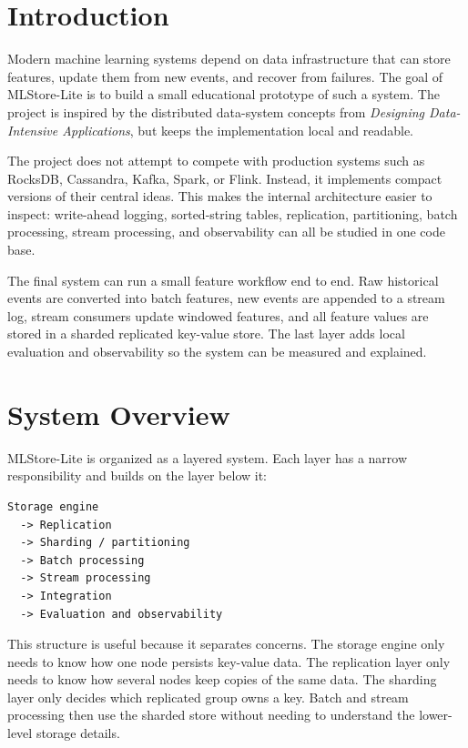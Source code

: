 \section{Introduction}

Modern machine learning systems depend on data infrastructure that can store
features, update them from new events, and recover from failures. The goal of
MLStore-Lite is to build a small educational prototype of such a system. The
project is inspired by the distributed data-system concepts from \textit{Designing
Data-Intensive Applications}, but keeps the implementation local and readable.

The project does not attempt to compete with production systems such as RocksDB,
Cassandra, Kafka, Spark, or Flink. Instead, it implements compact versions of
their central ideas. This makes the internal architecture easier to inspect:
write-ahead logging, sorted-string tables, replication, partitioning, batch
processing, stream processing, and observability can all be studied in one code
base.

The final system can run a small feature workflow end to end. Raw historical
events are converted into batch features, new events are appended to a stream
log, stream consumers update windowed features, and all feature values are
stored in a sharded replicated key-value store. The last layer adds local
evaluation and observability so the system can be measured and explained.

\section{System Overview}

MLStore-Lite is organized as a layered system. Each layer has a narrow
responsibility and builds on the layer below it:

\begin{verbatim}
Storage engine
  -> Replication
  -> Sharding / partitioning
  -> Batch processing
  -> Stream processing
  -> Integration
  -> Evaluation and observability
\end{verbatim}

This structure is useful because it separates concerns. The storage engine only
needs to know how one node persists key-value data. The replication layer only
needs to know how several nodes keep copies of the same data. The sharding layer
only decides which replicated group owns a key. Batch and stream processing then
use the sharded store without needing to understand the lower-level storage
details.

